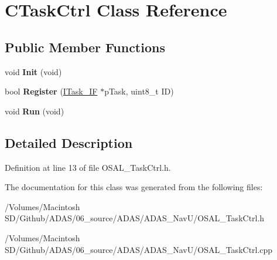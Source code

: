 \hypertarget{class_c_task_ctrl}{}\section{C\+Task\+Ctrl Class Reference}
\label{class_c_task_ctrl}
\subsection*{Public Member Functions}
\begin{DoxyCompactItemize}
\item 
\mbox{\label{class_c_task_ctrl_a12ec6e8d4a490eba9ebdf22d32cf292b}} 
void {\bfseries Init} (void)
\item 
\mbox{\label{class_c_task_ctrl_a20457bd4d4a033c8aeeb44e9d4dc3c7c}} 
bool {\bfseries Register} (\mbox{\hyperlink{class_i_task___i_f}{I\+Task\+\_\+\+IF}} $\ast$p\+Task, uint8\+\_\+t ID)
\item 
\mbox{\label{class_c_task_ctrl_ab36ffef43b3bd33303ed7d068b2e89cf}} 
void {\bfseries Run} (void)
\end{DoxyCompactItemize}


\subsection{Detailed Description}


Definition at line 13 of file O\+S\+A\+L\+\_\+\+Task\+Ctrl.\+h.



The documentation for this class was generated from the following files\+:\begin{DoxyCompactItemize}
\item 
/\+Volumes/\+Macintosh S\+D/\+Github/\+A\+D\+A\+S/06\+\_\+source/\+A\+D\+A\+S/\+A\+D\+A\+S\+\_\+\+Nav\+U/O\+S\+A\+L\+\_\+\+Task\+Ctrl.\+h\item 
/\+Volumes/\+Macintosh S\+D/\+Github/\+A\+D\+A\+S/06\+\_\+source/\+A\+D\+A\+S/\+A\+D\+A\+S\+\_\+\+Nav\+U/O\+S\+A\+L\+\_\+\+Task\+Ctrl.\+cpp\end{DoxyCompactItemize}
